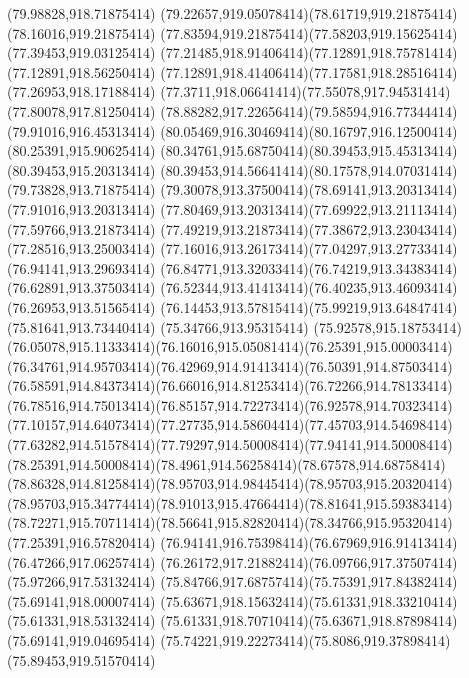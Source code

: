 {{	\closepath
	\moveto(79.98828,918.71875414)
	\curveto(79.22657,919.05078414)(78.61719,919.21875414)(78.16016,919.21875414)
	\curveto(77.83594,919.21875414)(77.58203,919.15625414)(77.39453,919.03125414)
	\curveto(77.21485,918.91406414)(77.12891,918.75781414)(77.12891,918.56250414)
	\curveto(77.12891,918.41406414)(77.17581,918.28516414)(77.26953,918.17188414)
	\curveto(77.3711,918.06641414)(77.55078,917.94531414)(77.80078,917.81250414)
	\curveto(78.88282,917.22656414)(79.58594,916.77344414)(79.91016,916.45313414)
	\curveto(80.05469,916.30469414)(80.16797,916.12500414)(80.25391,915.90625414)
	\curveto(80.34761,915.68750414)(80.39453,915.45313414)(80.39453,915.20313414)
	\curveto(80.39453,914.56641414)(80.17578,914.07031414)(79.73828,913.71875414)
	\curveto(79.30078,913.37500414)(78.69141,913.20313414)(77.91016,913.20313414)
	\curveto(77.80469,913.20313414)(77.69922,913.21113414)(77.59766,913.21873414)
	\curveto(77.49219,913.21873414)(77.38672,913.23043414)(77.28516,913.25003414)
	\curveto(77.16016,913.26173414)(77.04297,913.27733414)(76.94141,913.29693414)
	\curveto(76.84771,913.32033414)(76.74219,913.34383414)(76.62891,913.37503414)
	\curveto(76.52344,913.41413414)(76.40235,913.46093414)(76.26953,913.51565414)
	\curveto(76.14453,913.57815414)(75.99219,913.64847414)(75.81641,913.73440414)
	\lineto(75.34766,913.95315414)
	\lineto(75.92578,915.18753414)
	\curveto(76.05078,915.11333414)(76.16016,915.05081414)(76.25391,915.00003414)
	\curveto(76.34761,914.95703414)(76.42969,914.91413414)(76.50391,914.87503414)
	\curveto(76.58591,914.84373414)(76.66016,914.81253414)(76.72266,914.78133414)
	\curveto(76.78516,914.75013414)(76.85157,914.72273414)(76.92578,914.70323414)
	\curveto(77.10157,914.64073414)(77.27735,914.58604414)(77.45703,914.54698414)
	\curveto(77.63282,914.51578414)(77.79297,914.50008414)(77.94141,914.50008414)
	\curveto(78.25391,914.50008414)(78.4961,914.56258414)(78.67578,914.68758414)
	\curveto(78.86328,914.81258414)(78.95703,914.98445414)(78.95703,915.20320414)
	\curveto(78.95703,915.34774414)(78.91013,915.47664414)(78.81641,915.59383414)
	\curveto(78.72271,915.70711414)(78.56641,915.82820414)(78.34766,915.95320414)
	\lineto(77.25391,916.57820414)
	\curveto(76.94141,916.75398414)(76.67969,916.91413414)(76.47266,917.06257414)
	\curveto(76.26172,917.21882414)(76.09766,917.37507414)(75.97266,917.53132414)
	\curveto(75.84766,917.68757414)(75.75391,917.84382414)(75.69141,918.00007414)
	\curveto(75.63671,918.15632414)(75.61331,918.33210414)(75.61331,918.53132414)
	\curveto(75.61331,918.70710414)(75.63671,918.87898414)(75.69141,919.04695414)
	\curveto(75.74221,919.22273414)(75.8086,919.37898414)(75.89453,919.51570414)
}}
